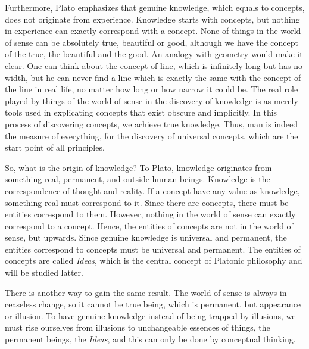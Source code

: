 \documentclass[11pt]{article}
\begin{document}
\begin{sloppypar}
\newline

Furthermore, Plato emphasizes that genuine knowledge, which equals to concepts, does not originate from experience. 
Knowledge starts with concepts, but nothing in experience can exactly correspond with a concept. 
None of things in the world of sense can be absolutely true, beautiful or good, although we have the concept of the true, the beautiful and the good. 
An analogy with geometry would make it clear. 
One can think about the concept of line, which is infinitely long but has no width, but he can never find a line which is exactly the same with the concept of the line in real life, no matter how long or how narrow it could be. 
The real role played by things of the world of sense in the discovery of knowledge is as merely tools used in explicating concepts that exist obscure and implicitly. 
In this process of discovering concepts, we achieve true knowledge. 
Thus, man is indeed the measure of everything, for the discovery of universal concepts, which are the start point of all principles.

\newline

So, what is the origin of knowledge? 
To Plato, knowledge originates from something real, permanent, and outside human beings. 
Knowledge is the correspondence of thought and reality. 
If a concept have any value as knowledge, something real must correspond to it. 
Since there are concepts, there must be entities correspond to them. 
However, nothing in the world of sense can exactly correspond to a concept. 
Hence, the entities of concepts are not in the world of sense, but upwards. 
Since genuine knowledge is universal and permanent, the entities correspond to concepts must be universal and permanent. 
The entities of concepts are called \textit{Ideas}, which is the central concept of Platonic philosophy and will be studied latter.

\newline

There is another way to gain the same result. 
The world of sense is always in ceaseless change, so it cannot be true being, which is permanent, but appearance or illusion. 
To have genuine knowledge instead of being trapped by illusions, we must rise ourselves from illusions to unchangeable essences of things, the permanent beings, the \textit{Ideas}, and this can only be done by conceptual thinking.

\newline


\end{sloppypar}
\end{document}
